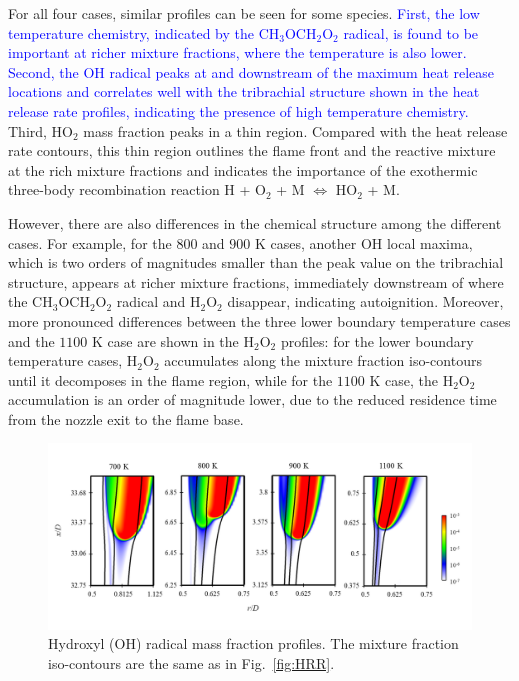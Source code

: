 \documentclass[review,3p,times]{elsarticle}
\begin{document}
For all four cases, similar profiles can be seen for some species.  \textcolor{blue}{First, the low temperature chemistry, indicated by the CH$_3$OCH$_2$O$_2$ radical, is found to be important at richer mixture fractions, where the temperature is also lower.  Second, the OH radical peaks at and downstream of the maximum heat release locations and correlates well with the tribrachial structure shown in the heat release rate profiles, indicating the presence of high temperature chemistry.}  Third, HO$_2$ mass fraction peaks in a thin region.  Compared with the heat release rate contours, this thin region outlines the flame front and the reactive mixture at the rich mixture fractions and indicates the importance of the exothermic three-body recombination reaction H + O$_2$ + M $\Longleftrightarrow$ HO$_2$ + M.


However, there are also differences in the chemical structure among the different cases.  For example, for the $800$ and $900$ K cases, another OH local maxima, which is two orders of magnitudes smaller than the peak value on the tribrachial structure, appears at richer mixture fractions, immediately downstream of where the CH$_3$OCH$_2$O$_2$ radical and H$_2$O$_2$ disappear, indicating autoignition.  Moreover, more pronounced differences between the three lower boundary temperature cases and the $1100$ K case are shown in the H$_2$O$_2$ profiles: for the lower boundary temperature cases, H$_2$O$_2$ accumulates along the mixture fraction iso-contours  until it decomposes in the flame region, while for the $1100$ K case, the H$_2$O$_2$ accumulation is an order of magnitude lower, due to the reduced residence time from the nozzle exit to the flame base.
  

\begin{figure}[t]
  \centering
  \scriptsize
  \vspace{-0.1in}
  \includegraphics[width=1.0\textwidth]{OH.png}
  \normalsize
  \vspace{-0.1in}
  \caption{Hydroxyl (OH) radical mass fraction profiles.  The mixture fraction iso-contours are the same as in Fig.~\ref{fig:HRR}.}
  \label{fig:OH}
\end{figure}
\end{document}
